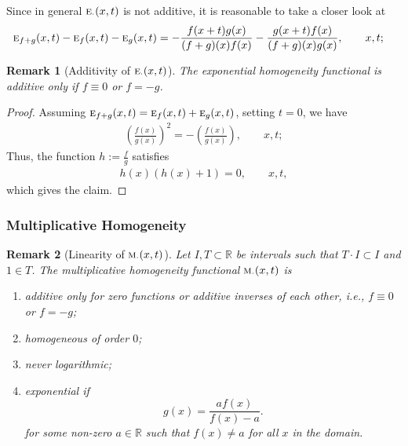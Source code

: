 \documentclass{amsart}
\makeatletter
\theoremstyle{plain}
\newtheorem{remark}{Remark}
\numberwithin{equation}{section}
\def\lambda{\Greekmath 0115 }%
\def\FindBoldGroup{%
   {\setbox0=\hbox{$\mathbf{x\global\edef\theboldgroup{\the\mathgroup}}$}}%
}
\def\Greekmath#1#2#3#4{%
    \if@compatibility
        \ifnum\mathgroup=\symbold
           \mathchoice{\mbox{\boldmath$\displaystyle\mathchar"#1#2#3#4$}}%
                      {\mbox{\boldmath$\textstyle\mathchar"#1#2#3#4$}}%
                      {\mbox{\boldmath$\scriptstyle\mathchar"#1#2#3#4$}}%
                      {\mbox{\boldmath$\scriptscriptstyle\mathchar"#1#2#3#4$}}%
        \else
           \mathchar"#1#2#3#4%
        \fi 
    \else 
        \FindBoldGroup
        \ifnum\mathgroup=\theboldgroup %
           \mathchoice{\mbox{\boldmath$\displaystyle\mathchar"#1#2#3#4$}}%
                      {\mbox{\boldmath$\textstyle\mathchar"#1#2#3#4$}}%
                      {\mbox{\boldmath$\scriptstyle\mathchar"#1#2#3#4$}}%
                      {\mbox{\boldmath$\scriptscriptstyle\mathchar"#1#2#3#4$}}%
        \else
           \mathchar"#1#2#3#4%
        \fi     	    
	  \fi}
\newcommand{\mh}{\textsc{m}}
\newcommand{\eh}{\textsc{e}}
\newcommand{\R}{{\mathbb{R}}}
\makeatother
\begin{document}
Since in general $\eh_{\cdot}(x,t)$ is not additive,
it is reasonable to take a closer look at
\begin{align*}
\eh_{f+g}(x,t) -\eh_{f}(x,t) - \eh_{g}(x,t) 
&=
- \frac{f(x+t) g(x)}{(f+g)(x) f(x)}
- \frac{g(x+t) f(x)}{(f+g)(x) g(x)}, \qquad x,t;
\end{align*}

\begin{remark}[Additivity of $\eh_{\cdot}(x,t)$]
The exponential homogeneity functional is additive only if $f \equiv 0$ or $f=-g$.
\end{remark}

\begin{proof}
Assuming $\eh_{f+g}(x,t) = \eh_{f}(x,t)+ \eh_{g}(x,t)$, setting $t=0$, we have
\begin{align*}
\left(\frac{f(x)}{g(x)}\right)^2 = -\left(\frac{f(x)}{g(x)}\right), \qquad x,t;
\end{align*}
Thus, the function $h:=\frac{f}{g}$
satisfies
\begin{align*}
h(x) \left( h(x)+1 \right)=0, \qquad x,t,
\end{align*}
which gives the claim.
\end{proof}

\subsubsection{Multiplicative Homogeneity}
\begin{remark}[Linearity of $\mh_{\cdot}(x,t)$]
Let $I,T \subset \R$ be intervals such that $T\cdot I \subset I$ and $1 \in T$.
The multiplicative homogeneity functional $\mh_{\cdot}(x,t)$  is
\begin{enumerate}
    \item 
additive only for zero functions or additive inverses of each other,
i.e., $f\equiv 0$ or $f=-g$;

   \item 
homogeneous of order $0$;

 \item
 never logarithmic;
  \item 
exponential if 
\[
g(x) = \frac{a f(x)}{f(x) - a}.
\]
for some non-zero $a \in \R$ such that $f(x) \neq a$ for all $x$ in the domain.
\end{enumerate}
\end{remark}
\end{document}
